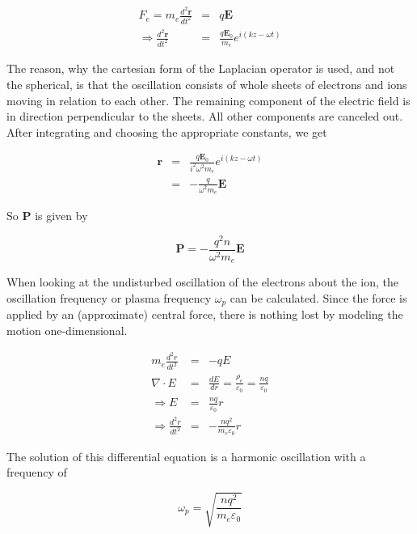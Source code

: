 \documentclass[a4paper,14pt]{extbook}
\begin{document}
\begin{eqnarray}
    F_e=m_e\frac{d^2\mathbf{r}}{dt^2}&=&q\mathbf{E}\label{force_on e} \\
    \Rightarrow \frac{d^2\mathbf{r}}{dt^2}&=&\frac{q \mathbf{E}_0}{m_e} e^{i(kz-\omega t)}
\end{eqnarray}

The reason, why the cartesian form of the Laplacian operator is used, and not the spherical, is that the oscillation consists of whole sheets of electrons and ions moving in relation to each other. The remaining component of the electric field is in direction perpendicular to the sheets. All other components are canceled out. After integrating and choosing the appropriate constants, we get

\begin{eqnarray}
    \mathbf{r}&=&\frac{q \mathbf{E}_0}{i^2 \omega^2 m_e} e^{i(kz-\omega t)}\label{solution_for_r} \\
    &=&-\frac{q }{ \omega^2 m_e} \mathbf{E}
\end{eqnarray}

So \textbf{P} is given by

\begin{equation}\label{polarization_solution}
    \mathbf{P}=-\frac{q^2 n }{ \omega^2 m_e} \mathbf{E}
\end{equation}

When looking at the undisturbed oscillation of the electrons about the ion, the oscillation frequency or plasma frequency $\omega_p$ can be calculated. Since the force is applied by an (approximate) central force, there is nothing lost by modeling the motion one-dimensional.

\begin{eqnarray}
  m_e\frac{d^2r}{dt^2} &=& -qE\\
  \nabla \cdot E &=& \frac{dE}{dr}=\frac{\rho_e}{\varepsilon_0}=\frac{nq}{\varepsilon_0}\\
  \Rightarrow E&=&\frac{nq}{\varepsilon_0}r\\
  \Rightarrow \frac{d^2r}{dt^2} &=&-\frac{nq^2}{m_e\varepsilon_0}r
\end{eqnarray}

The solution of this differential equation is a harmonic oscillation with a frequency of

\begin{equation}\label{plasmafrequency}
    \omega_p=\sqrt{\frac{nq^2}{m_e\varepsilon_0}}
\end{equation}
\end{document}
